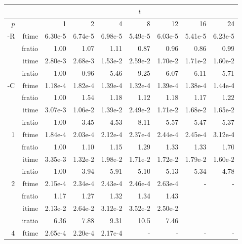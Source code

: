 \documentclass[a4]{article}
\begin{document}
\begin{table}
\begin{center}
\begin{tabular}{|r|r|r|r|r|r|r|r|r|}
\hline 
     &  & \multicolumn{7}{c|}{$t$} \\ \hline
    $p$  &  & 1           & 2    & 4    & 8    & 12   & 16    & 24  \\ \hline\hline
    -R  & ftime &   6.30e-5 &   6.74e-5 &   6.98e-5 &   5.49e-5 &   6.03e-5 &   5.41e-5 &   6.23e-5   \\ 
      & fratio &    1.00 &    1.07 &    1.11 &    0.87 &   0.96 &   0.86 &   0.99  \\ 
     & itime &    2.80e-3 &   2.68e-3 &   1.53e-2 &   2.59e-2 &   1.70e-2 &   1.71e-2 &   1.60e-2    \\ 
     & iratio &   1.00 &    0.96 &   5.46 &    9.25 &    6.07 &    6.11 &    5.71      \\ \hline 
    -C  & ftime &  1.18e-4 &   1.82e-4 &   1.39e-4 &   1.32e-4 &   1.39e-4 &   1.38e-4 &   1.44e-4     \\ 
      & fratio &  1.00 &   1.54 &   1.18 &   1.12 &   1.18 &   1.17 &   1.22    \\ 
     & itime &    3.07e-3 &   1.06e-2 &   1.39e-2 &   2.49e-2 &   1.71e-2 &   1.68e-2 &   1.65e-2    \\ 
     & iratio &  1.00 &   3.45 &   4.53 &   8.11 &   5.57 &   5.47 &   5.37       \\ \hline \hline
    1  & ftime & 1.84e-4 &   2.03e-4 &   2.12e-4 &   2.37e-4 &   2.44e-4 &   2.45e-4 &   3.12e-4     \\ 
      & fratio &    1.00 &   1.10 &   1.15 &   1.29 &   1.33 &   1.33 &   1.70   \\ 
     & itime &    3.35e-3 &   1.32e-2 &   1.98e-2 &   1.71e-2 &   1.72e-2 &   1.79e-2 &   1.60e-2    \\ 
     & iratio &  1.00 &   3.94 &   5.91 &   5.10 &   5.13 &   5.34 &   4.78     \\ \hline
    2  & ftime &   2.15e-4 &   2.34e-4 &   2.43e-4 &   2.46e-4 &   2.63e-4 &    - & - \\ 
      & fratio &  1.17 &   1.27 &   1.32 &   1.34 &   1.43 &      &  \\
      & itime &   2.13e-2 &   2.64e-2 &   3.12e-2 &   3.52e-2 &   2.50e-2 &      &  \\
      & iratio &    6.36 &   7.88 &   9.31 &   10.5 &   7.46 &    &  \\ \hline
    4  & ftime &  2.65e-4 &   2.20e-4 &   2.17e-4 &    - & - & - & - \\ 

\end{tabular}
\end{center}
\end{table}
\end{document}

